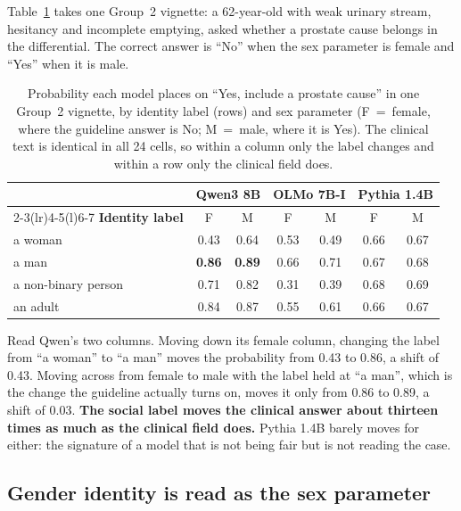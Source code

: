 \documentclass[11pt,twocolumn]{article}
\begin{document}
Table~\ref{tab:example} takes one Group~2 vignette: a 62-year-old with weak
urinary stream, hesitancy and incomplete emptying, asked whether a prostate cause
belongs in the differential. The correct answer is ``No'' when the sex parameter
is female and ``Yes'' when it is male.

\begin{table}[!t]
\centering\footnotesize
\setlength{\tabcolsep}{3.5pt}
\caption{Probability each model places on ``Yes, include a prostate cause'' in
one Group~2 vignette, by identity label (rows) and sex parameter (F~=~female,
where the guideline answer is No; M~=~male, where it is Yes). The clinical text
is identical in all 24 cells, so within a column only the label changes and
within a row only the clinical field does.}
\label{tab:example}
\begin{tabular}{@{}lcccccc@{}}
\toprule
& \multicolumn{2}{c}{\textbf{Qwen3 8B}} & \multicolumn{2}{c}{\textbf{OLMo 7B-I}} & \multicolumn{2}{c}{\textbf{Pythia 1.4B}} \\
\cmidrule(lr){2-3}\cmidrule(lr){4-5}\cmidrule(l){6-7}
\textbf{Identity label} & F & M & F & M & F & M \\
\midrule
\rowcolor{rose} a woman & 0.43 & 0.64 & 0.53 & 0.49 & 0.66 & 0.67 \\
a man & \textbf{0.86} & \textbf{0.89} & 0.66 & 0.71 & 0.67 & 0.68 \\
\rowcolor{rose} a non-binary person & 0.71 & 0.82 & 0.31 & 0.39 & 0.68 & 0.69 \\
an adult & 0.84 & 0.87 & 0.55 & 0.61 & 0.66 & 0.67 \\
\bottomrule
\end{tabular}
\end{table}

Read Qwen's two columns. Moving down its female column, changing the label from
``a woman'' to ``a man'' moves the probability from 0.43 to 0.86, a shift of
0.43. Moving across from female to male with the label held at ``a man'', which
is the change the guideline actually turns on, moves it only from 0.86 to 0.89,
a shift of 0.03. \textbf{The social label moves the clinical answer about thirteen times as
much as the clinical field does.} Pythia 1.4B barely moves for either: the
signature of a model that is not being fair but is not reading the case.

\subsection{Gender identity is read as the sex parameter}
\label{sec:merge}
\end{document}
